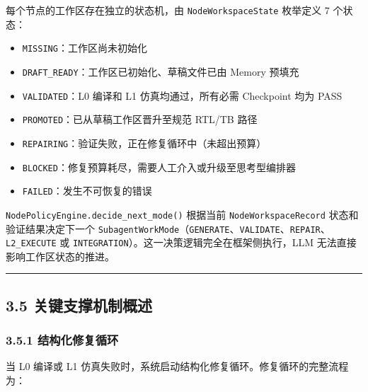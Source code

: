 每个节点的工作区存在独立的状态机，由 \texttt{NodeWorkspaceState}
枚举定义 7 个状态：

\begin{itemize}
\tightlist
\item
  \texttt{MISSING}：工作区尚未初始化
\item
  \texttt{DRAFT\_READY}：工作区已初始化、草稿文件已由 Memory 预填充
\item
  \texttt{VALIDATED}：L0 编译和 L1 仿真均通过，所有必需 Checkpoint 均为
  PASS
\item
  \texttt{PROMOTED}：已从草稿工作区晋升至规范 RTL/TB 路径
\item
  \texttt{REPAIRING}：验证失败，正在修复循环中（未超出预算）
\item
  \texttt{BLOCKED}：修复预算耗尽，需要人工介入或升级至思考型编排器
\item
  \texttt{FAILED}：发生不可恢复的错误
\end{itemize}

\texttt{NodePolicyEngine.decide\_next\_mode()} 根据当前
\texttt{NodeWorkspaceRecord} 状态和验证结果决定下一个
\texttt{SubagentWorkMode}（\texttt{GENERATE}、\texttt{VALIDATE}、\texttt{REPAIR}、\texttt{L2\_EXECUTE}
或 \texttt{INTEGRATION}）。这一决策逻辑完全在框架侧执行，LLM
无法直接影响工作区状态的推进。

\begin{center}\rule{0.5\linewidth}{0.5pt}\end{center}

\subsection{3.5
关键支撑机制概述}\label{ux5173ux952eux652fux6491ux673aux5236ux6982ux8ff0}

\subsubsection{3.5.1
结构化修复循环}\label{ux7ed3ux6784ux5316ux4feeux590dux5faaux73af}

当 L0 编译或 L1
仿真失败时，系统启动结构化修复循环。修复循环的完整流程为：

